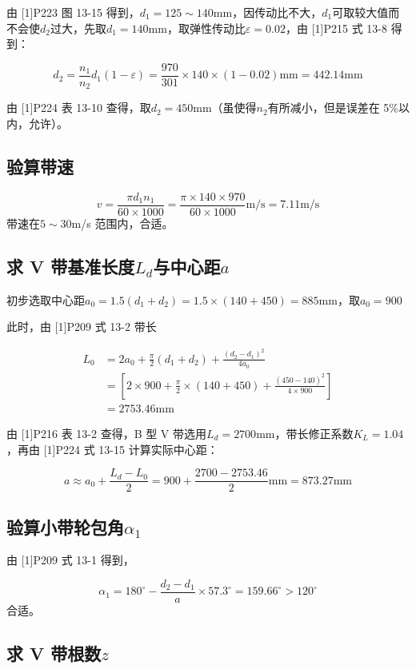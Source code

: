 \documentclass[12pt]{ctexart}
\begin{document}
由 [1]P223 图 13-15 得到，$d_1 = 125\sim 140\text{mm}$，因传动比不大，$d_1$可取较大值而不会使$d_2$过大，先取$d_1=140\text{mm}$，取弹性传动比$\varepsilon = 0.02$，由 [1]P215 式 13-8 得到：

$$d_2 = \frac{n_1}{n_2}d_1(1-\varepsilon)=\frac{970}{301}\times 140\times (1-0.02)\text{mm} = 442.14\text{mm}$$

由  [1]P224 表 13-10 查得，取$d_2=450\text{mm}$（虽使得$n_2$有所减小，但是误差在 5\%以内，允许）。

\subsection{验算带速}

$$v =\frac{\pi d_1n_1}{60\times 1000}=\frac{\pi \times 140 \times 970}{60\times 1000}\text{m/s}=7.11\text{m/s}$$带速在$5\sim 30$m/s 范围内，合适。

\subsection{求 V 带基准长度$L_d$与中心距$a$}

初步选取中心距$a_0=1.5(d_1+d_2)=1.5\times (140+450)=885\text{mm}$，取$a_0=900$

此时，由 [1]P209 式 13-2 带长

\begin{align*}
    L_0 & =2a_0+\frac{\pi}{2}(d_1+d_2)+\frac{(d_2-d_1)^2}{4a_0} \\
    & =\left[2\times 900 + \frac{\pi}{2}\times (140+450)+\frac{(450-140)^2}{4\times 900}\right]\\
    & =2753.46\text{mm}
\end{align*}

由 [1]P216 表 13-2 查得，B 型 V 带选用$L_d=2700\text{mm}$，带长修正系数$K_L=1.04$，再由 [1]P224 式 13-15 计算实际中心距：

$$a \approx a_0 + \frac{L_d-L_0}{2}=900 + \frac{2700-2753.46}{2}\text{mm}=873.27\text{mm}$$

\subsection{验算小带轮包角$\alpha_1$}

由 [1]P209 式 13-1 得到，

$$\alpha_1=180^\circ -\frac{d_2-d_1}{a}\times 57.3^\circ =159.66^\circ > 120^\circ $$
合适。

\subsection{求 V 带根数$z$}
\end{document}
